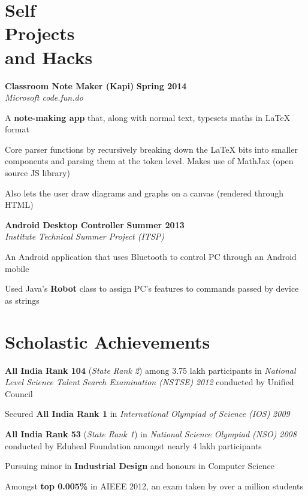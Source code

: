 \documentclass[margin,11pt]{resume}
\begin{document}
\begin{resume}
\pagebreak

\vspace{-150em}

\section{\mysidestyle Self \\ Projects \\ and Hacks}
\textbf{Classroom Note Maker (Kapi)} \hfill \textbf{Spring 2014}\\
\textsl{Microsoft code.fun.do}
\begin{list2}
\item A \textbf{note-making app} that, along with normal text, typesets maths in \LaTeX{} format
\item Core parser functions by recursively breaking down the \LaTeX{} bits into smaller components and parsing them at the token level. Makes use of MathJax (open source JS library)
\item Also lets the user draw diagrams and graphs on a canvas (rendered through HTML)
\end{list2}
\vspace{-2.5mm}
\textbf{Android Desktop Controller} \hfill \textbf{Summer 2013}\\
\textsl{Institute Technical Summer Project (ITSP)}
\begin{list2}
\item An Android application that uses Bluetooth to control PC through an Android mobile 
\item Used Java's \textbf{Robot} class to assign PC's features to commands passed by device as strings
\end{list2}

\section{\mysidestyle Scholastic Achievements}
\begin{list2}
\item \textbf{All India Rank 104} (\textsl{State Rank 2}) among 3.75 lakh participants in \textsl{National Level Science Talent Search Examination (NSTSE)} \textsl{2012} conducted by Unified Council
\item Secured \textbf{All India Rank 1} in \textsl{International Olympiad of Science (IOS)} \textsl{2009}
\item \textbf{All India Rank 53} (\textsl{State Rank 1}) in \textsl{National Science Olympiad (NSO)} \textsl{2008} conducted by Eduheal Foundation amongst nearly 4 lakh participants
\item Pursuing minor in \textbf{Industrial Design} and honours in Computer Science
\item Amongst \textbf{top 0.005\%} in AIEEE 2012, an exam taken by over a million students
 \end{list2}
 

\end{resume}
\end{document}

